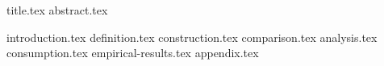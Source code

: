 \documentclass[11pt]{llncs}
\begin{document}
{title.tex}
\thispagestyle{plain}
{abstract.tex}

{introduction.tex}
{definition.tex}
{construction.tex}
{comparison.tex}
{analysis.tex}
{consumption.tex}
{empirical-results.tex}
\newpage
\appendix
{appendix.tex}



\end{document}
